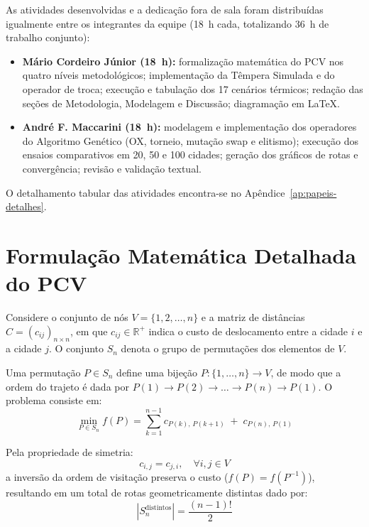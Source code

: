 \documentclass[11pt]{article}
\begin{document}
As atividades desenvolvidas e a dedicação fora de sala foram distribuídas igualmente entre os integrantes da equipe (18~h cada, totalizando 36~h de trabalho conjunto):
\begin{itemize}\setlength{\itemsep}{0pt}\setlength{\parskip}{1pt}
    \item \textbf{Mário Cordeiro Júnior (18~h):} formalização matemática do PCV nos quatro níveis metodológicos; implementação da Têmpera Simulada e do operador de troca; execução e tabulação dos 17 cenários térmicos; redação das seções de Metodologia, Modelagem e Discussão; diagramação em LaTeX.
    \item \textbf{André F. Maccarini (18~h):} modelagem e implementação dos operadores do Algoritmo Genético (OX, torneio, mutação swap e elitismo); execução dos ensaios comparativos em 20, 50 e 100 cidades; geração dos gráficos de rotas e convergência; revisão e validação textual.
\end{itemize}
O detalhamento tabular das atividades encontra-se no Apêndice~\ref{ap:papeis-detalhes}.




\newpage
\appendix

\section{Formulação Matemática Detalhada do PCV} \label{ap:model-cv}

Considere o conjunto de nós $V = \{1, 2, \dots, n\}$ e a matriz de distâncias $C = (c_{ij})_{n \times n}$, em que $c_{ij} \in \mathbb{R}^+$ indica o custo de deslocamento entre a cidade $i$ e a cidade $j$. O conjunto $S_n$ denota o grupo de permutações dos elementos de $V$.

Uma permutação $P \in S_n$ define uma bijeção $P: \{1, \dots, n\} \to V$, de modo que a ordem do trajeto é dada por $P(1) \to P(2) \to \dots \to P(n) \to P(1)$. O problema consiste em:
\begin{equation} \label{eq:pcv_geral}
\min_{P \in S_n} f(P) = \sum_{k=1}^{n-1} c_{P(k),\, P(k+1)} \;+\; c_{P(n),\, P(1)}
\end{equation}

Pela propriedade de simetria:
\begin{equation}
c_{i, j} = c_{j, i}, \quad \forall i, j \in V
\end{equation}
a inversão da ordem de visitação preserva o custo ($f(P) = f(P^{-1})$), resultando em um total de rotas geometricamente distintas dado por:
\begin{equation}
|S_n^{\text{distintos}}| = \frac{(n-1)!}{2}
\end{equation}
\end{document}
